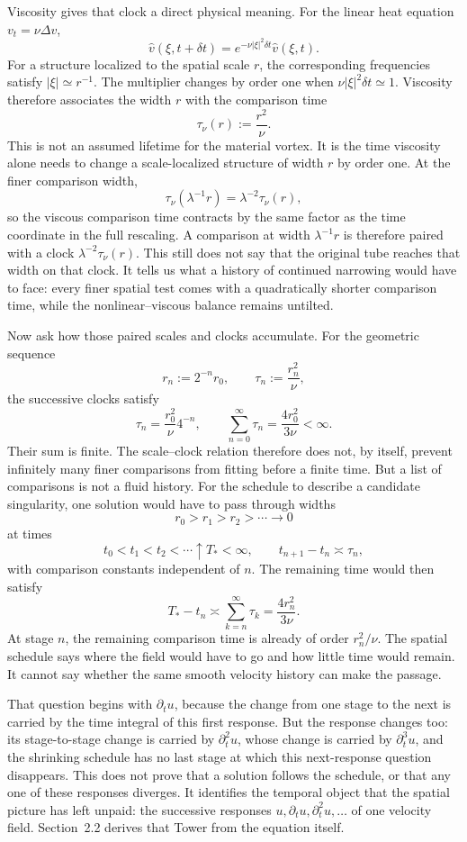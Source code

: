 
Viscosity gives that clock a direct physical meaning.
For the linear heat equation \(v_t=\nu\Delta v\),
\[
  \widehat v(\xi,t+\delta t)
  =
  e^{-\nu|\xi|^2\delta t}\widehat v(\xi,t).
\]
For a structure localized to the spatial scale \(r\), the corresponding frequencies satisfy \(|\xi|\simeq r^{-1}\).
The multiplier changes by order one when \(\nu|\xi|^2\delta t\simeq1\).
Viscosity therefore associates the width \(r\) with the comparison time
\[
  \tau_\nu(r)
  :=
  \frac{r^2}{\nu}.
\]
This is not an assumed lifetime for the material vortex.
It is the time viscosity alone needs to change a scale-localized structure of width \(r\) by order one.
At the finer comparison width,
\[
  \tau_\nu(\lambda^{-1}r)
  =
  \lambda^{-2}\tau_\nu(r),
\]
so the viscous comparison time contracts by the same factor as the time coordinate in the full \NavierStokes{} rescaling.
A comparison at width \(\lambda^{-1}r\) is therefore paired with a clock \(\lambda^{-2}\tau_\nu(r)\).
This still does not say that the original tube reaches that width on that clock.
It tells us what a history of continued narrowing would have to face: every finer spatial test comes with a quadratically shorter comparison time, while the nonlinear--viscous balance remains untilted.


Now ask how those paired scales and clocks accumulate.
For the geometric sequence
\[
  r_n:=2^{-n}r_0,
  \qquad
  \tau_n:=\frac{r_n^2}{\nu},
\]
the successive clocks satisfy
\[
  \tau_n
  =
  \frac{r_0^2}{\nu}4^{-n},
  \qquad
  \sum_{n=0}^{\infty}\tau_n
  =
  \frac{4r_0^2}{3\nu}
  <
  \infty.
\]
Their sum is finite.
The scale--clock relation therefore does not, by itself, prevent infinitely many finer comparisons from fitting before a finite time.
But a list of comparisons is not a fluid history.
For the schedule to describe a candidate singularity, one solution would have to pass through widths
\[
  r_0>r_1>r_2>\cdots\longrightarrow0
\]
at times
\[
  t_0<t_1<t_2<\cdots\uparrow T_*<\infty,
  \qquad
  t_{n+1}-t_n\asymp\tau_n,
\]
with comparison constants independent of \(n\).
The remaining time would then satisfy
\[
  T_*-t_n
  \asymp
  \sum_{k=n}^{\infty}\tau_k
  =
  \frac{4r_n^2}{3\nu}.
\]
At stage \(n\), the remaining comparison time is already of order \(r_n^2/\nu\).
The spatial schedule says where the field would have to go and how little time would remain.
It cannot say whether the same smooth velocity history can make the passage.

That question begins with \(\partial_tu\), because the change from one stage to the next is carried by the time integral of this first response.
But the response changes too: its stage-to-stage change is carried by \(\partial_t^2u\), whose change is carried by \(\partial_t^3u\), and the shrinking schedule has no last stage at which this next-response question disappears.
This does not prove that a solution follows the schedule, or that any one of these responses diverges.
It identifies the temporal object that the spatial picture has left unpaid: the successive responses \(u,\partial_tu,\partial_t^2u,\ldots\) of one velocity field.
Section~2.2 derives that Tower from the \NavierStokes{} equation itself.
